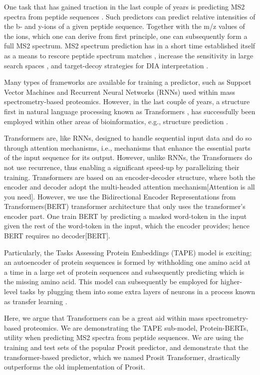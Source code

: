 \documentclass[10pt,a4paper]{article}
\begin{document}
One task that has gained traction in the last couple of years is predicting MS2 spectra from peptide sequences \cite{Degroeve2015-fh,Gessulat2019-el}. Such predictors can predict relative intensities of the b- and y-ions of a given peptide sequence. Together with the m/z values of the ions, which one can derive from first principle, one can subsequently form a full MS2 spectrum. MS2 spectrum prediction has in a short time established itself as a means to rescore peptide spectrum matches \cite{C_Silva2019-ja}, increase the sensitivity in large search spaces \cite{Wilhelm2021-mz}, and target-decoy strategies for DIA interpretation \cite{Searle2020-yk}.  
 
Many types of frameworks are available for training a predictor, such as Support Vector Machines and Recurrent Neural Networks (RNNs) used within mass spectrometry-based proteomics. However, in the last couple of years, a structure first in natural language processing \cite{noauthor_undated-sz} known as Transformers \cite{Vaswani2017-sy}, has successfully been employed within other areas of bioinformatics, e.g., structure prediction \cite{Rao2019-qq,Bepler2021-ci}.

Transformers are, like RNNs, designed to handle sequential input data and do so through attention mechanisms, i.e., mechanisms that enhance the essential parts of the input sequence for its output. However, unlike RNNs, the Transformers do not use recurrence, thus enabling a significant speed-up by parallelizing their training. Transformers are based on an encoder-decoder structure, where both the encoder and decoder adopt the multi-headed attention mechanism[Attention is all you need]. However, we use the Bidirectional Encoder Representations from Transformers(BERT) transformer architecture that only uses the transformer's encoder part. One train BERT by predicting a masked word-token in the input given the rest of the word-token in the input, which the encoder provides; hence BERT requires no decoder[BERT].

Particularly, the Tasks Assessing Protein Embeddings (TAPE) model \cite{Rao2019-qq} is exciting; an autoencoder of protein sequences is formed by withholding one amino acid at a time in a large set of protein sequences and subsequently predicting which is the missing amino acid. This model can subsequently be employed for higher-level tasks by plugging them into some extra layers of neurons in a process known as transfer learning \cite{Rao2019-qq,Bepler2021-ci}.

Here, we argue that Transformers can be a great aid within mass spectrometry-based proteomics. We are demonstrating the TAPE sub-model, Protein-BERTs,  utility when predicting MS2 spectra from peptide sequences. We are using the training and test sets of the popular Prosit \cite{Gessulat2019-el} predictor, and demonstrate that the transformer-based predictor, which we named Prosit Transformer, drastically outperforms the old implementation of Prosit. 
\end{document}
